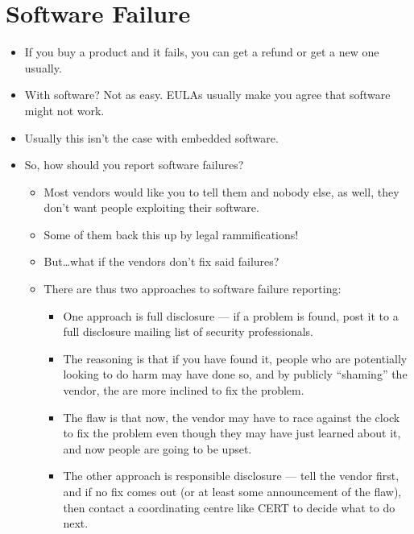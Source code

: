\documentclass{article}
\begin{document}
\section{Software Failure}
\begin{itemize}
    \item If you buy a product and it fails, you can get a refund or get a new one usually.
    \item With software?  Not as easy.  EULAs usually make you agree that software might not work.
    \item Usually this isn't the case with embedded software.
    \item So, how should you report software failures?
        \begin{itemize}
            \item Most vendors would like you to tell them and nobody else, as well, they don't want people exploiting their software.
            \item Some of them back this up by legal rammifications!
            \item But\dots what if the vendors don't fix said failures?
            \item There are thus two approaches to software failure reporting:
                \begin{itemize}
                    \item One approach is full disclosure --- if a problem is found, post it to a full disclosure mailing list of security professionals.
                    \item The reasoning is that if you have found it, people who are potentially looking to do harm may have done so, and by publicly ``shaming'' the vendor, the are more inclined to fix the problem.
                    \item The flaw is that now, the vendor may have to race against the clock to fix the problem even though they may have just learned about it, and now people are going to be upset.
                    \item The other approach is responsible disclosure --- tell the vendor first, and if no fix comes out (or at least some announcement of the flaw), then contact a coordinating centre like CERT to decide what to do next.
                \end{itemize}
        \end{itemize}
\end{itemize}
\end{document}
